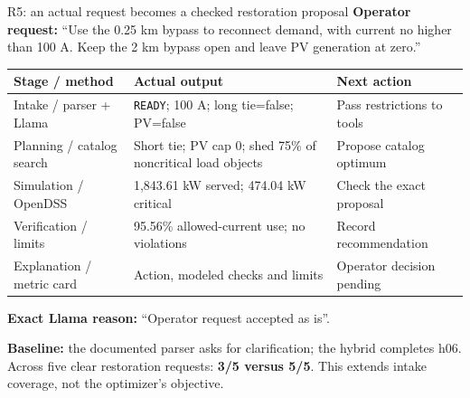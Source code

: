 \begin{frame}[t]{R5: an actual request becomes a checked restoration proposal}
\deepdive
{}
\footnotesize
\textbf{Operator request:} ``Use the 0.25 km bypass to reconnect demand, with current no higher than 100 A. Keep the 2 km bypass open and leave PV generation at zero.''
\par\smallskip
\begin{tabular}{@{}p{.23\linewidth}p{.43\linewidth}p{.28\linewidth}@{}}
\toprule Stage / method & Actual output & Next action \\
\midrule
Intake / parser + Llama & \texttt{READY}; 100 A; long tie=false; PV=false & Pass restrictions to tools \\
Planning / catalog search & Short tie; PV cap 0; shed 75\% of noncritical load objects & Propose catalog optimum \\
Simulation / OpenDSS & 1,843.61 kW served; 474.04 kW critical & Check the exact proposal \\
Verification / limits & 95.56\% allowed-current use; no violations & Record recommendation \\
Explanation / metric card & Action, modeled checks and limits & Operator decision pending \\
\bottomrule
\end{tabular}
\par\smallskip
\textbf{Exact Llama reason:} ``Operator request accepted as is''.
\par\smallskip
\textbf{Baseline:} the documented parser asks for clarification; the hybrid completes h06. Across five clear restoration requests: \textbf{3/5 versus 5/5}. This extends intake coverage, not the optimizer's objective.

\end{frame}
